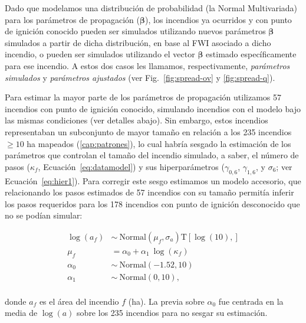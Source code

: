 Dado que modelamos una distribución de probabilidad (la Normal Multivariada) para los parámetros de propagación ($\boldsymbol{\beta}$), los incendios ya ocurridos y con punto de ignición conocido pueden ser simulados utilizando nuevos parámetros $\boldsymbol{\beta}$ simulados a partir de dicha distribución, en base al FWI asociado a dicho incendio, o pueden ser simulados utilizando el vector $\boldsymbol{\beta}$ estimado específicamente para ese incendio. A estos dos casos les llamamos, respectivamente, \textit{parámetros simulados} y \textit{parámetros ajustados} (ver Fig.~\ref{fig:spread-ov} y \ref{fig:spread-q}). 

Para estimar la mayor parte de los parámetros de propagación utilizamos 57 incendios con punto de ignición conocido, simulando incendios con el modelo bajo las mismas condiciones (ver detalles abajo). Sin embargo, estos incendios representaban un subconjunto de mayor tamaño en relación a los 235 incendios $\ge10$ ha mapeados (\cref{cap:patrones}), lo cual habría sesgado la estimación de los parámetros que controlan el tamaño del incendio simulado, a saber, el número de pasos ($\kappa_f$, Ecuación~\ref{eq:datamodel}) y sus hiperparámetros ($\gamma_{0,6}$, $\gamma_{1, 6}$, y $\sigma_6$; ver Ecuación~\ref{eq:hier1}). Para corregir este sesgo estimamos un modelo accesorio, que relacionando los pasos estimados de 57 incendios con su tamaño permitía inferir los pasos requeridos para los 178 incendios con punto de ignición desconocido que no se podían simular: 

\begin{equation}
\begin{aligned}
    \log(a_f) &\sim \ \text{Normal}(\mu_f, \sigma_a)\text{T}[\log(10), ] \\
    \mu_f &= \alpha_0 + \alpha_1 \ \log(\kappa_f) \\
    \alpha_0 &\sim \ \text{Normal}(-1.52, 10) \\
    \alpha_1 &\sim \ \text{Normal}(0, 10), \\
\end{aligned}
\end{equation}

\noindent donde $a_f$ es el área del incendio $f$ (ha). La previa sobre $\alpha_0$ fue centrada en la media de $\log(a)$ sobre los 235 incendios para no sesgar su estimación.

